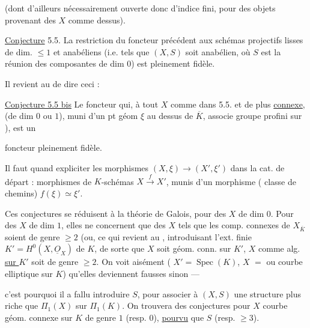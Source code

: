 (dont  d'ailleurs nécessairement ouverte donc
 d'indice fini, pour des objets provenant des $X$ comme dessus).

\uline{Conjecture} 5.5. La restriction du foncteur précédent
aux schémas projectifs lisses de dim. $\leq 1$ et anabéliens
(i.e. tels que $(X,S)$ soit anabélien, où $S$ est la réunion des
composantes de dim $0$) est pleinement fidèle.


Il revient au  de dire ceci :


\uline{Conjecture 5.5 bis} Le foncteur qui, à tout $X$
 comme dans 5.5. et de plus \uline{connexe},
(de dim $0$ ou $1$), muni d'un pt géom $\xi$ au dessus de
$\overline K$, associe  groupe
profini  sur
), est un



foncteur pleinement fidèle.

Il faut quand  expliciter les
morphismes $(X,\xi)\longrightarrow(X',\xi')$ dans la cat. de départ :
morphismes de $K$-schémas $X\xrightarrow{f}X'$, munis d'un morphisme
 ( classe de chemins)
 $f(\xi)\simeq\xi'$.

Ces conjectures se réduisent à la théorie de Galois, pour des $X$ de
 dim $0$. Pour des $X$ de dim $1$, elles ne concernent que des $X$ tels
que les comp. connexes de $X_{\overline K}$ soient de genre $\geq 2$
(ou, ce qui revient au , introduisant
l'ext. finie $K'=H^0(X,\underline{O}_X)$ de $K$, de sorte que $X$ soit
géom. conn. sur $K'$,  $X$ comme
  alg.
\uline{sur $K'$} soit de genre $\geq 2$. On voit aisément
( $X'=\operatorname{Spec}(K)$,
$X$  $=$
 ou courbe elliptique sur $K$)
qu'elles deviennent fausses sinon ---



c'est pourquoi il a fallu introduire $S$,
pour associer à $(X,S)$ une structure plus riche que $\Pi_1(X)$ sur
$\Pi_1(K)$. On trouvera des conjectures 
pour $X$  courbe géom. connexe sur $K$ de genre $1$
(resp. $0$), \uline{pourvu} que $S$
 (resp. $\geq 3$).


